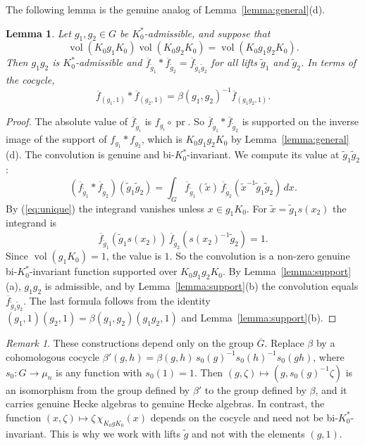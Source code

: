 \documentclass[12pt,letterpaper]{amsart}
\numberwithin{equation}{section}
\newtheorem{lemma}[theorem]{Lemma}
\theoremstyle{definition}
\theoremstyle{remark}
\newtheorem{remark}[theorem]{Remark}
\DeclareMathOperator{\vol}{vol}
\DeclareMathOperator{\pr}{pr}
\newcommand{\Gbar}{\overline{G}}
\newcommand{\fbar}{\overline{f}}
\begin{document}
The following lemma is the genuine analog of
Lemma~\ref{lemma:general}(d).

\begin{lemma}
\label{lemma:genuine}
Let $g_1,g_2\in G$ be $K_0^*$-admissible, and suppose that
\[
\vol(K_0g_1K_0)\vol(K_0g_2K_0)=\vol(K_0g_1g_2K_0).
\]
Then $g_1g_2$ is $K_0^*$-admissible and
$\fbar_{\tilde g_1}*\fbar_{\tilde g_2}=\fbar_{\tilde g_1\tilde g_2}$
for all lifts $\tilde g_1$ and $\tilde g_2$. In terms of the cocycle,
\[
\fbar_{(g_1,1)}*\fbar_{(g_2,1)}=\beta(g_1,g_2)^{-1}\fbar_{(g_1g_2,1)}.
\]
\end{lemma}

\begin{proof}
The absolute value of $\fbar_{\tilde g_i}$ is $f_{g_i}\circ\pr$. So
$\fbar_{\tilde g_1}*\fbar_{\tilde g_2}$ is supported on the inverse
image of the support of $f_{g_1}*f_{g_2}$, which is $K_0g_1g_2K_0$ by
Lemma~\ref{lemma:general}(d). The convolution is genuine and
bi-$K_0^*$-invariant. We compute its value at
$\tilde g_1\tilde g_2$:
\[
(\fbar_{\tilde g_1}*\fbar_{\tilde g_2})(\tilde g_1\tilde g_2)
=\int_G\fbar_{\tilde g_1}(\tilde x)\,
\fbar_{\tilde g_2}(\tilde x^{-1}\tilde g_1\tilde g_2)\,dx .
\]
By (\ref{eq:unique}) the integrand vanishes unless $x\in g_1K_0$. For
$\tilde x=\tilde g_1s(x_2)$ the integrand is
\[
\fbar_{\tilde g_1}(\tilde g_1s(x_2))\,
\fbar_{\tilde g_2}(s(x_2)^{-1}\tilde g_2)=1 .
\]
Since $\vol(g_1K_0)=1$, the value is $1$. So the convolution is a
non-zero genuine bi-$K_0^*$-invariant function supported over
$K_0g_1g_2K_0$. By Lemma~\ref{lemma:support}(a), $g_1g_2$ is
admissible, and by Lemma~\ref{lemma:support}(b) the convolution equals
$\fbar_{\tilde g_1\tilde g_2}$. The last formula follows from the
identity $(g_1,1)(g_2,1)=\beta(g_1,g_2)(g_1g_2,1)$ and
Lemma~\ref{lemma:support}(b).
\end{proof}

\begin{remark}
\label{rem:cocycle}
These constructions depend only on the group $\Gbar$. Replace $\beta$
by a cohomologous cocycle
$\beta'(g,h)=\beta(g,h)\,s_0(g)^{-1}s_0(h)^{-1}s_0(gh)$, where
$s_0:G\to\mu_n$ is any function with $s_0(1)=1$. Then
$(g,\zeta)\mapsto(g,s_0(g)^{-1}\zeta)$ is an isomorphism from the group
defined by $\beta'$ to the group defined by $\beta$, and it carries
genuine Hecke algebras to genuine Hecke algebras. In contrast, the
function $(x,\zeta)\mapsto\zeta\,\chi_{K_0gK_0}(x)$ depends on the
cocycle and need not be bi-$K_0^*$-invariant. This is why we work with
lifts $\tilde g$ and not with the elements $(g,1)$.
\end{remark}
\end{document}
